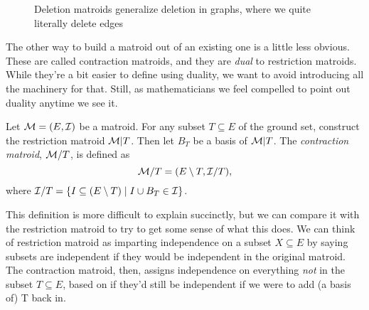 \documentclass[12pt,oneside]{../../sfsuthesis}
\begin{document}
\begin{figure}[H]
\begin{subfigure}[t]{.45\textwidth}
    \end{subfigure}
    \caption{Deletion matroids generalize deletion in graphs, where we quite literally delete edges}\label{fig:contractionMatroid}
\end{figure}

The other way to build a matroid out of an existing one is a little less obvious.
These are called contraction matroids, and they are \emph{dual} to restriction matroids.
While they're a bit easier to define using duality, we want to avoid introducing all the machinery for that.
Still, as mathematicians we feel compelled to point out duality anytime we see it.

\begin{definition}\th\label{def:contractionMatroid}

    Let \( \mathcal{M} = (E, \mathcal{I}) \) be a matroid.
    For any subset \( T \subseteq E \) of the ground set, construct the restriction matroid \( \mathcal{M}|T \).
    Then let \( B_T \) be a basis of \( \mathcal{M}|T \).
    The \emph{contraction matroid}, \( \mathcal{M}/T \), is defined as
    \[
        \mathcal{M}/T = ( E \setminus T, \mathcal{I}/T ),
    \]
    where \( \mathcal{I}/T = \{ I \subseteq (E \setminus T) \; | \; I \cup B_T \in \mathcal{I} \} \).

\end{definition}

This definition is more difficult to explain succinctly, but we can compare it with the restriction matroid to try to get some sense of what this does.
We can think of  restriction matroid as imparting independence on a subset \( X \subseteq E \) by saying subsets are independent if they would be independent in the original matroid.
The contraction matroid, then, assigns independence on everything \emph{not} in the subset \( T \subseteq E \),  based on if they'd still be independent if we were to add (a basis of) T back in.
\end{document}

